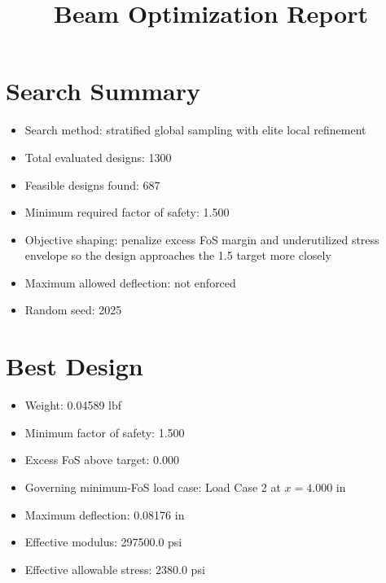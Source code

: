 \documentclass[11pt]{article}
\title{Beam Optimization Report}
\date{}
\begin{document}
\maketitle

\section*{Search Summary}
\begin{itemize}
\item Search method: stratified global sampling with elite local refinement
\item Total evaluated designs: 1300
\item Feasible designs found: 687
\item Minimum required factor of safety: 1.500
\item Objective shaping: penalize excess FoS margin and underutilized stress envelope so the design approaches the 1.5 target more closely
\item Maximum allowed deflection: not enforced
\item Random seed: 2025
\end{itemize}

\section*{Best Design}
\begin{itemize}
\item Weight: 0.04589 lbf
\item Minimum factor of safety: 1.500
\item Excess FoS above target: 0.000
\item Governing minimum-FoS load case: Load Case 2 at $x=4.000$ in
\item Maximum deflection: 0.08176 in
\item Effective modulus: 297500.0 psi
\item Effective allowable stress: 2380.0 psi
\end{itemize}
\end{document}
